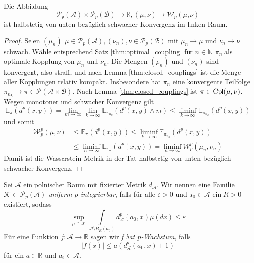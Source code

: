 \begin{lemma}\label{thm:semicontinuous_wasserstein}
Die Abbildung 
$$\mathcal{P}_p(\mathcal{A})\times \mathcal{P}_p(\mathcal{B}) \rightarrow \mathbb{R}, (\mu, \nu) \mapsto \mathcal{W}_p(\mu, \nu)$$
ist halbstetig von unten bezüglich schwacher Konvergenz im linken Raum.
\end{lemma}
\begin{proof}
    Seien $(\mu_n), \mu \in \mathcal{P}_p(\mathcal{A}), (\nu_n), \nu \in \mathcal{P}_p(\mathcal{B})$ mit $\mu_n \rightarrow \mu$ und $\nu_n \rightarrow \nu$ schwach. Wähle entsprechend Satz \ref{thm:optimal_coupling} für $n \in \mathbb{N}$ $\pi_n$ als optimale Kopplung von $\mu_n$ und $\nu_n$. Die Mengen $(\mu_n)$ und $(\nu_n)$ sind konvergent, also straff, und nach Lemma \ref{thm:closed_couplings} ist die Menge aller Kopplungen relativ kompakt. Insbesondere hat $\pi_n$ eine konvergente Teilfolge $\pi_{n_k} \rightarrow \pi \in \mathcal{P}(\mathcal{A}\times\mathcal{B})$. Nach Lemma \ref{thm:closed_couplings} ist $\pi \in \operatorname{Cpl}(\mu, \nu)$. 
    Wegen monotoner und schwacher Konvergenz gilt
    $$\mathbb{E}_\pi(d^p(x,y)) = \lim_{m\rightarrow\infty}\lim_{k\rightarrow\infty} \mathbb{E}_{\pi_{n_k}}(d^p(x,y) \wedge m) \leq \liminf_{k\rightarrow\infty} \mathbb{E}_{\pi_{n_k}}(d^p(x,y))$$
    und somit
    \begin{align*}
        \mathcal{W}_p^p(\mu, \nu) &\leq \mathbb{E}_\pi(d^p(x,y)) \leq \liminf_{k\rightarrow\infty} \mathbb{E}_{\pi_{n_k}}(d^p(x,y)) \\
        &\leq \liminf_{n\rightarrow\infty}\mathbb{E}_{\pi_n}(d^p(x,y)) = \liminf_{n\rightarrow\infty} \mathcal{W}_p^p(\mu_n, \nu_n)
    \end{align*}
    Damit ist die Wasserstein-Metrik in der Tat halbstetig von unten bezüglich schwacher Konvergenz.
\end{proof}
\begin{definition}
    Sei $\mathcal{A}$ ein polnischer Raum mit fixierter Metrik $d_\mathcal{A}$. Wir nennen eine Familie $\mathcal{K} \subset \mathcal{P}_p(\mathcal{A})$ \emph{uniform $p$-integrierbar}, falls für alle $\varepsilon>0$ und $a_0 \in \mathcal{A}$ ein $R>0$ existiert, sodass
    $$\sup\limits_{\mu \in \mathcal{K}} \int\limits_{\mathcal{A}\setminus B_{R}(a_0)} d_\mathcal{A}^p(a_0, x)\mu(dx) \leq \varepsilon $$
    Für eine Funktion $f: \mathcal{A} \rightarrow \mathbb{R}$ sagen wir \emph{f hat $p$-Wachstum}, falls 
    $$|f(x)|\leq a(d_\mathcal{A}^p(a_0, x) + 1)$$
    für ein $a\in \mathbb{R}$ und $a_0 \in \mathcal{A}$.
\end{definition}
